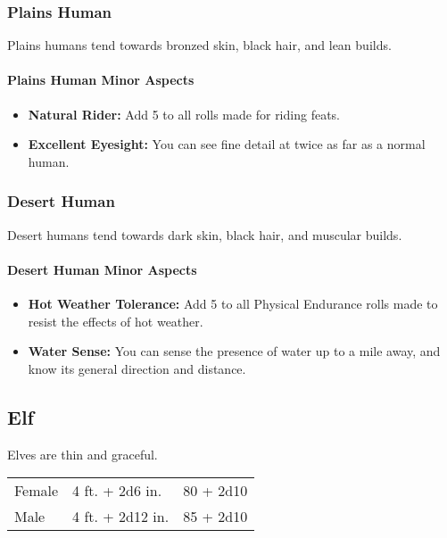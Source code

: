 \begin{multicols}{2}
\subsubsection{Plains Human}

Plains humans tend towards bronzed skin, black hair, and lean builds.

\paragraph{Plains Human Minor Aspects}

\begin{itemize}
    \item \textbf{Natural Rider:} Add 5 to all rolls made for riding feats.
    \item \textbf{Excellent Eyesight:} You can see fine detail at twice as far as a normal human.
\end{itemize}

\subsubsection{Desert Human}

Desert humans tend towards dark skin, black hair, and muscular builds.

\paragraph{Desert Human Minor Aspects}

\begin{itemize}
    \item \textbf{Hot Weather Tolerance:} Add 5 to all Physical Endurance rolls made to resist the effects of hot weather.
    \item \textbf{Water Sense:} You can sense the presence of water up to a mile away, and know its general direction and distance.
\end{itemize}

\subsection{Elf}

Elves are thin and graceful.

\begin{center}
{
\begin{xtabular}{|l|l|l|}
Female & 4 ft. + 2d6 in. & 80 + 2d10 \\
Male & 4 ft. + 2d12 in. & 85 + 2d10 \\
\hline
\end{xtabular}
}
\end{center}


\end{multicols}

